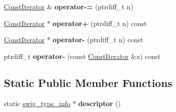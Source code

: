 \begin{DoxyCompactItemize}
\item 
\hyperlink{structswig_1_1ConstIterator}{Const\+Iterator} \& {\bfseries operator-\/=} (ptrdiff\+\_\+t n)\hypertarget{structswig_1_1ConstIterator_a168196e36aba5f5b66fc962b697d3bd8}{}\label{structswig_1_1ConstIterator_a168196e36aba5f5b66fc962b697d3bd8}

\item 
\hyperlink{structswig_1_1ConstIterator}{Const\+Iterator} $\ast$ {\bfseries operator+} (ptrdiff\+\_\+t n) const \hypertarget{structswig_1_1ConstIterator_a73bff83ca20079558303903c5cb35b89}{}\label{structswig_1_1ConstIterator_a73bff83ca20079558303903c5cb35b89}

\item 
\hyperlink{structswig_1_1ConstIterator}{Const\+Iterator} $\ast$ {\bfseries operator-\/} (ptrdiff\+\_\+t n) const \hypertarget{structswig_1_1ConstIterator_a82ad85dc1e2ff374eda14936218568f4}{}\label{structswig_1_1ConstIterator_a82ad85dc1e2ff374eda14936218568f4}

\item 
ptrdiff\+\_\+t {\bfseries operator-\/} (const \hyperlink{structswig_1_1ConstIterator}{Const\+Iterator} \&x) const \hypertarget{structswig_1_1ConstIterator_a38a19b1c663e3ed5cdc9ff6649fe9f42}{}\label{structswig_1_1ConstIterator_a38a19b1c663e3ed5cdc9ff6649fe9f42}

\end{DoxyCompactItemize}
\subsection*{Static Public Member Functions}
\begin{DoxyCompactItemize}
\item 
static \hyperlink{structswig__type__info}{swig\+\_\+type\+\_\+info} $\ast$ {\bfseries descriptor} ()\hypertarget{structswig_1_1ConstIterator_a689944b9417226db99e38370ab15e8f7}{}\label{structswig_1_1ConstIterator_a689944b9417226db99e38370ab15e8f7}

\end{DoxyCompactItemize}
